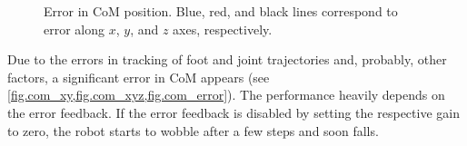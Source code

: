 \begin{figure}[!ht]
    \centering
\caption[Error in {\bf CoM} position]{Error in \ac{CoM} position. Blue, red, 
and black lines correspond to error along $x$, $y$, and $z$ axes, respectively.}
\label{fig.com_error}
\end{figure}

Due to the errors in tracking of foot and joint trajectories and, probably,
other factors, a significant error in \ac{CoM} appears (see 
\cref{fig.com_xy,fig.com_xyz,fig.com_error}). The performance heavily depends 
on the error feedback. If the error feedback is disabled by setting the 
respective gain to zero, the robot starts to wobble after a few steps and 
soon falls.

